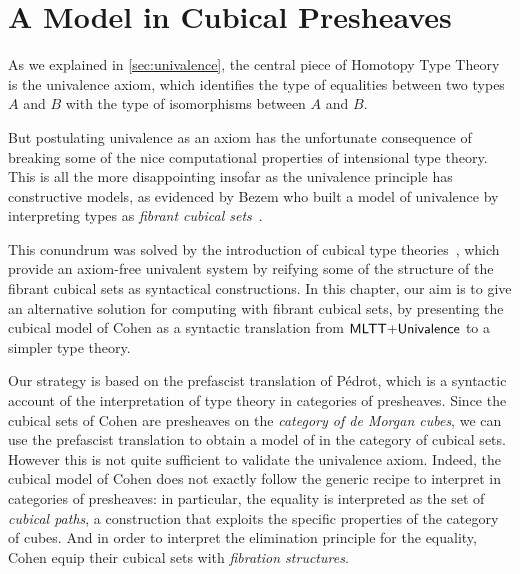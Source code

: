 \setchapterpreamble[u]{\margintoc}
\chapter{A Model in Cubical Presheaves}

As we explained in \cref{sec:univalence}, the central piece of Homotopy Type 
Theory is the univalence axiom, which identifies the type of equalities between 
two types \( A \) and \( B \) with the type of isomorphisms between \( A \) and 
\( B \).
% 

But postulating univalence as an axiom has the unfortunate consequence of 
breaking some of the nice computational properties of intensional type theory.
% 
This is all the more disappointing insofar as the univalence principle has 
constructive models, as evidenced by Bezem \etal who built a model of 
univalence by interpreting types as 
\emph{fibrant cubical sets}~.

This conundrum was solved by the introduction of cubical type 
theories~, which provide an axiom-free univalent system by 
reifying some of the structure of the fibrant cubical sets as syntactical 
constructions.
% 
In this chapter, our aim is to give an alternative solution for computing with
fibrant cubical sets, by presenting the cubical model of Cohen \etal \cite{CCHM} 
as a syntactic translation from \( \mathsf{MLTT}{+}\mathsf{Univalence} \) to a simpler 
type theory.

Our strategy is based on the prefascist translation of Pédrot, which is a 
syntactic account of the interpretation of type theory in categories
of presheaves.
% 
Since the cubical sets of Cohen \etal are presheaves on the 
\emph{category of de Morgan cubes}, we can use the prefascist translation to obtain a 
model of \MLTT in the category of cubical sets. 
% 
However this is not quite sufficient to validate the univalence axiom.
% 
Indeed, the cubical model of Cohen \etal does not exactly follow the generic
recipe to interpret \MLTT in categories of presheaves: in particular, the
equality is interpreted as the set of \emph{cubical paths}, a construction that 
exploits the specific properties of the category of cubes.
% 
And in order to interpret the elimination principle for the equality, Cohen 
\etal equip their cubical sets with \emph{fibration structures}.

